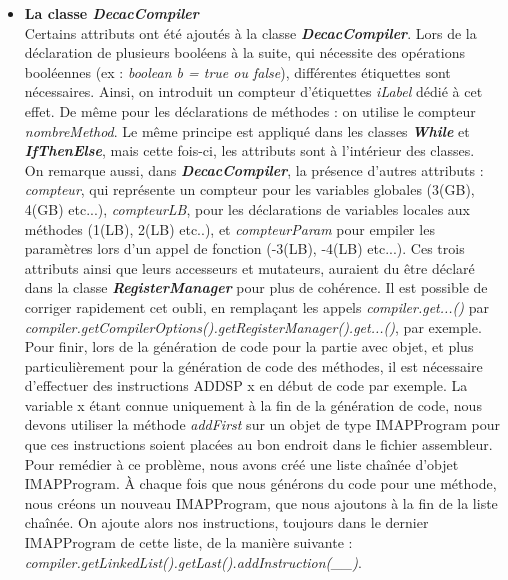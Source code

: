 \documentclass{article}
\begin{document}
\begin{itemize}
\item \textbf{La classe \textit{DecacCompiler}} \newline
\\
Certains attributs ont été ajoutés à la classe \textit{\textbf{DecacCompiler}}.\newline
Lors de la déclaration de plusieurs booléens à la suite, qui nécessite des opérations booléennes (ex : \textit{boolean b = true ou false}), différentes étiquettes
sont nécessaires. Ainsi, on introduit un compteur d'étiquettes \textit{iLabel} dédié à cet effet. 
De même pour les déclarations de méthodes : on utilise le compteur \textit{nombreMethod}.
Le même principe est appliqué dans les classes \textbf{\textit{While}} et \textbf{\textit{IfThenElse}}, mais cette fois-ci, les attributs sont
à l'intérieur des classes. \newline
\\
On remarque aussi, dans \textbf{\textit{DecacCompiler}}, la présence d'autres attributs : \textit{compteur}, qui représente un compteur pour les variables globales (3(GB), 4(GB) etc...), \textit{compteurLB}, pour les déclarations de variables locales aux méthodes (1(LB), 2(LB) etc..), et \textit{compteurParam} pour empiler les paramètres lors d'un appel de fonction (-3(LB), -4(LB) etc...). 
Ces trois attributs ainsi que leurs accesseurs et mutateurs, auraient du être déclaré dans la classe \textbf{\textit{RegisterManager}} pour plus de cohérence. 
Il est possible de corriger rapidement cet oubli, en remplaçant les appels \textit{compiler.get...()} par \textit{compiler.getCompilerOptions().getRegisterManager().get...()}, par exemple.\newline
\\
Pour finir, lors de la génération de code pour la partie avec objet, et plus particulièrement pour
la génération de code des méthodes, il est nécessaire d'effectuer des instructions ADDSP x en début de code par exemple.
La variable x étant connue uniquement à la fin de la génération de code, nous devons utiliser la méthode \textit{addFirst} sur un objet de type IMAPProgram pour que ces instructions soient placées au bon endroit dans le fichier assembleur.
Pour remédier à ce problème, nous avons créé une liste chaînée d'objet IMAPProgram. À chaque fois que nous générons du code pour une méthode, nous créons un nouveau IMAPProgram, que nous ajoutons à la fin de la liste chaînée. On ajoute alors nos instructions, toujours dans le dernier IMAPProgram de cette liste, de la manière suivante : \textit{compiler.getLinkedList().getLast().addInstruction(\_\_)}.


\end{itemize}
\end{document}
